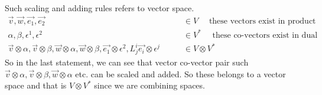 \documentclass{article}
\begin{document}
	Such scaling and adding rules refers to vector space.
	\large
	\begin{align*}
		\overrightarrow{v},\overrightarrow{w},\overrightarrow{e_{1}},\overrightarrow{e_{2}}\quad\quad &\in V \quad\text{ these vectors exist in product space V}\\
		\alpha,\beta,\epsilon^{1},\epsilon^{2}\quad\quad &\in V^{*}\quad \text{ these co-vectors exist in dual space}\\
		\overrightarrow{v}\otimes\alpha,\overrightarrow{v}\otimes\beta,\overrightarrow{w}\otimes\alpha,\overrightarrow{w}\otimes\beta,\overrightarrow{e_{1}}\otimes\epsilon^{2},L^{i}_{j}\overrightarrow{e_{i}}\otimes\epsilon^{j}\quad\quad &\in V\otimes V^{*}
	\end{align*}
	\Large
	So in the last statement, we can see that vector co-vector pair such  $\overrightarrow{v}\otimes\alpha,\overrightarrow{v}\otimes\beta,\overrightarrow{w}\otimes\alpha$ etc. can be scaled and added. So these belongs to a vector space and that is $V\otimes V^{*}$ since we are combining spaces. 
\end{document}
